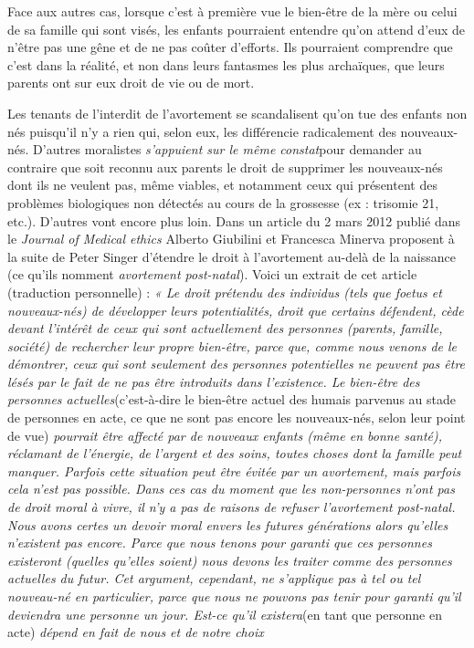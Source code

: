  Face aux autres cas, lorsque c'est à première vue le bien-être de la mère ou celui de sa famille qui sont visés, les enfants pourraient entendre qu'on attend d'eux de n'être pas une gêne et de ne pas coûter d'efforts. Ils pourraient comprendre que c'est dans la réalité, et non dans leurs fantasmes les plus archaïques, que leurs parents ont sur eux droit de vie ou de mort.
 
 Les tenants de l'interdit de l'avortement se scandalisent qu'on tue des enfants non nés puisqu'il n'y a rien qui, selon eux, les différencie radicalement des nouveaux-nés. D'autres moralistes \emph{s'appuient sur le même constat}pour demander au contraire que soit reconnu aux parents le droit de supprimer les nouveaux-nés dont ils ne veulent pas, même viables, et notamment ceux qui présentent des problèmes biologiques non détectés au cours de la grossesse (ex : trisomie 21, etc.). D'autres vont encore plus loin. Dans un article du 2 mars 2012 publié dans le \emph{Journal of Medical ethics} Alberto Giubilini et Francesca Minerva proposent à la suite de Peter Singer d'étendre le droit à l'avortement au-delà de la naissance (ce qu'ils nomment \emph{avortement post-natal}). Voici un extrait de cet article (traduction personnelle) :
 \emph{« Le droit prétendu des individus (tels que foetus et nouveaux-nés) de développer leurs potentialités, droit que certains défendent, cède devant l'intérêt de ceux qui sont actuellement des personnes (parents, famille, société) de rechercher leur propre bien-être, parce que, comme nous venons de le démontrer, ceux qui sont seulement des personnes potentielles ne peuvent pas être lésés par le fait de ne pas être introduits dans l'existence. Le bien-être des personnes actuelles}(c'est-à-dire le bien-être actuel des humais parvenus au stade de personnes en acte, ce que ne sont pas encore les nouveaux-nés, selon leur point de vue)\emph{ pourrait être affecté par de nouveaux enfants (même en bonne santé), réclamant de l'énergie, de l'argent et des soins, toutes choses dont la famille peut manquer. Parfois cette situation peut être évitée par un avortement, mais parfois cela n'est pas possible. Dans ces cas du moment que les non-personnes n'ont pas de droit moral à vivre, il n'y a pas de raisons de refuser l'avortement post-natal. Nous avons certes un devoir moral envers les futures générations alors qu'elles n'existent pas encore. Parce que nous tenons pour garanti que ces personnes existeront (quelles qu'elles soient) nous devons les traiter comme des personnes actuelles du futur. Cet argument, cependant, ne s'applique pas à tel ou tel nouveau-né en particulier, parce que nous ne pouvons pas tenir pour garanti qu'il deviendra une personne un jour. Est-ce qu'il existera}(en tant que personne en acte)\emph{ dépend en fait de nous et de notre choix}
